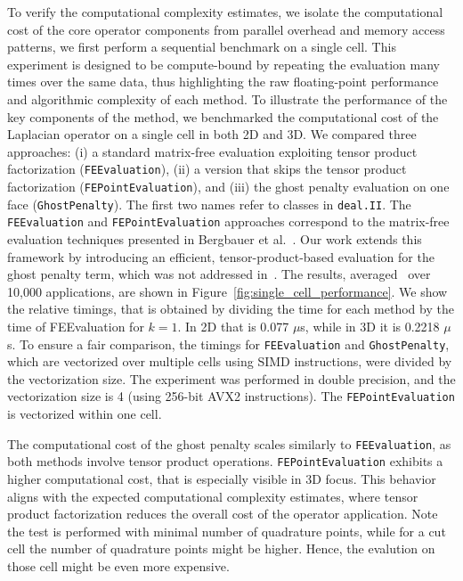 \documentclass[11pt,a4paper]{article}
\begin{document}
To verify the computational complexity estimates, we isolate the computational cost of the core operator components
from parallel overhead and memory access patterns, we first perform a sequential benchmark on a single cell. This
experiment is designed to be compute-bound by repeating the evaluation many times over the same data, thus highlighting
the raw floating-point performance and algorithmic complexity of each method. To illustrate the performance of the key
components of the method, we benchmarked the computational cost of the Laplacian operator on a single cell in both 2D
and 3D. We compared three approaches: (i) a standard matrix-free evaluation exploiting tensor product factorization
(\texttt{FEEvaluation}), (ii) a version that skips the tensor product factorization (\texttt{FEPointEvaluation}), and
(iii) the ghost penalty evaluation on one face (\texttt{GhostPenalty}). The first two names refer to classes in
\texttt{deal.II}. The \texttt{FEEvaluation} and \texttt{FEPointEvaluation} approaches correspond to the matrix-free
evaluation techniques presented in Bergbauer et al.~\cite{bergbauer2024high}. Our work extends this framework by
introducing an efficient, tensor-product-based evaluation for the ghost penalty term, which was not addressed
in~\cite{bergbauer2024high}. The results, averaged~\cite{hoefler2015scientific} over 10,000 applications, are shown in
Figure~\ref{fig:single_cell_performance}. We show the relative timings, that is obtained by dividing the time for each
method by the time of FEEvaluation for $k=1$. In 2D that is 0.077 $\mu$s, while in 3D it is 0.2218 $\mu$s. To ensure a
fair comparison, the timings for \texttt{FEEvaluation} and \texttt{GhostPenalty}, which are vectorized over multiple
cells using SIMD instructions, were divided by the vectorization size. The experiment was performed in double
precision, and the vectorization size is 4 (using 256-bit AVX2 instructions). The \texttt{FEPointEvaluation} is
vectorized within one cell.

The computational cost of the ghost penalty scales similarly to \texttt{FEEvaluation}, as both methods involve tensor
product operations. \texttt{FEPointEvaluation} exhibits a higher computational cost, that is especially visible in 3D
focus. This behavior aligns with the expected computational complexity estimates, where tensor product factorization
reduces the overall cost of the operator application. Note the test is performed with minimal number of quadrature
points, while for a cut cell the number of quadrature points might be higher. Hence, the evalution on those cell might
be even more expensive.
\end{document}

